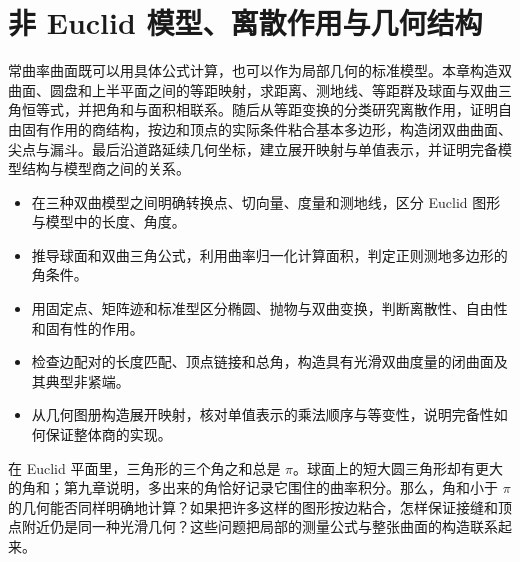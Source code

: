 
% 
% 

\chapter{非 Euclid 模型、离散作用与几何结构}
\label{g1:ch:10}

\begin{chapterabstract}
	常曲率曲面既可以用具体公式计算，也可以作为局部几何的标准模型。本章构造双曲面、圆盘和上半平面之间的等距映射，求距离、测地线、等距群及球面与双曲三角恒等式，并把角和与面积相联系。随后从等距变换的分类研究离散作用，证明自由固有作用的商结构，按边和顶点的实际条件粘合基本多边形，构造闭双曲曲面、尖点与漏斗。最后沿道路延续几何坐标，建立展开映射与单值表示，并证明完备模型结构与模型商之间的关系。
\end{chapterabstract}

\begin{learninggoals}
	\begin{itemize}
		\item 在三种双曲模型之间明确转换点、切向量、度量和测地线，区分 Euclid 图形与模型中的长度、角度。
		\item 推导球面和双曲三角公式，利用曲率归一化计算面积，判定正则测地多边形的角条件。
		\item 用固定点、矩阵迹和标准型区分椭圆、抛物与双曲变换，判断离散性、自由性和固有性的作用。
		\item 检查边配对的长度匹配、顶点链接和总角，构造具有光滑双曲度量的闭曲面及其典型非紧端。
		\item 从几何图册构造展开映射，核对单值表示的乘法顺序与等变性，说明完备性如何保证整体商的实现。
	\end{itemize}
\end{learninggoals}

在 Euclid 平面里，三角形的三个角之和总是 \(\pi\)。球面上的短大圆三角形却有更大的角和；第九章说明，多出来的角恰好记录它围住的曲率积分。那么，角和小于 \(\pi\) 的几何能否同样明确地计算？如果把许多这样的图形按边粘合，怎样保证接缝和顶点附近仍是同一种光滑几何？这些问题把局部的测量公式与整张曲面的构造联系起来。

\ProseParagraphBreak

